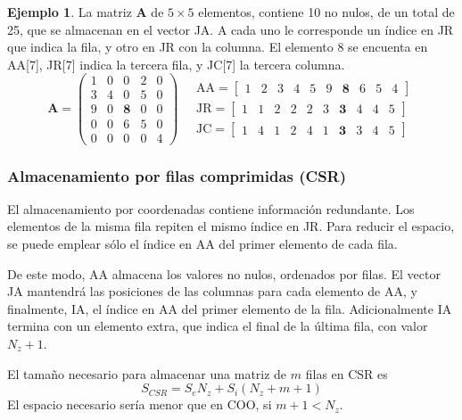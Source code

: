 \documentclass{article}
\newcommand*\mat[1]{ \begin{pmatrix} #1 \end{pmatrix}}
\newcommand*\arr[1]{ \begin{bmatrix} #1 \end{bmatrix}}
\theoremstyle{definition}
\newtheorem{ejemplo}{Ejemplo}[section]
\begin{document}
\begin{ejemplo}
La matriz \textbf{A} de $5\times5$ elementos, contiene 10 no nulos, de un total 
de 25, que se almacenan en el vector JA. A cada uno le corresponde un índice en 
JR que indica la fila, y otro en JR con la columna. El elemento 8 se encuenta en 
AA[7], JR[7] indica la tercera fila, y JC[7] la tercera columna.
$$ \textbf{A} = \mat{
	1 & 0 & 0 & 2 & 0 \\
	3 & 4 & 0 & 5 & 0 \\
	9 & 0 & \textbf{8} & 0 & 0 \\
	0 & 0 & 6 & 5 & 0 \\
	0 & 0 & 0 & 0 & 4 }
\quad
\begin{aligned}
	\text{AA} = \arr{ 1 & 2 & 3 & 4 & 5 & 9 & \textbf{8} & 6 & 5 & 4} \\
	\text{JR} = \arr{ 1 & 1 & 2 & 2 & 2 & 3 & \textbf{3} & 4 & 4 & 5} \\
	\text{JC} = \arr{ 1 & 4 & 1 & 2 & 4 & 1 & \textbf{3} & 3 & 4 & 5}
\end{aligned}
$$
\end{ejemplo}

\subsubsection{Almacenamiento por filas comprimidas (CSR)}

El almacenamiento por coordenadas contiene información redundante. Los elementos 
de la misma fila repiten el mismo índice en JR. Para reducir el espacio, se 
puede emplear sólo el índice en AA del primer elemento de cada fila.

De este modo, AA almacena los valores no nulos, ordenados por filas. El vector 
JA mantendrá las posiciones de las columnas para cada elemento de AA, y 
finalmente, IA, el índice en AA del primer elemento de la fila. Adicionalmente 
IA termina con un elemento extra, que indica el final de la última fila, con 
valor $N_z + 1$.

El tamaño necesario para almacenar una matriz de $m$ filas en CSR es
$$ S_{CSR} = S_e N_z + S_i (N_z + m + 1) $$
El espacio necesario sería menor que en COO, si $m + 1 < N_z$.
\end{document}
